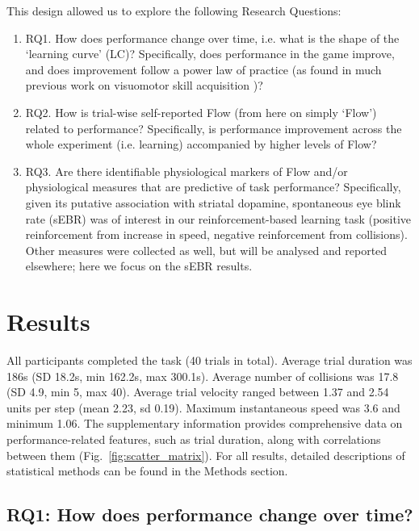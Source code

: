 \documentclass[fleqn,10pt]{wlscirep}
\begin{document}
This design allowed us to explore the following Research Questions:
\begin{enumerate}
	\item RQ1. How does performance change over time, i.e. what is the shape of the `learning curve' (LC)? Specifically, does performance in the game improve, and does improvement follow a power law of practice (as found in much previous work on visuomotor skill acquisition \cite{Newell1982})?

	\item RQ2. How is trial-wise self-reported Flow (from here on simply `Flow') related to performance? Specifically, is performance improvement across the whole experiment (i.e. learning) accompanied by higher levels of Flow?

	\item RQ3. Are there identifiable physiological markers of Flow and/or physiological measures that are predictive of task performance? Specifically, given its putative association with striatal dopamine\cite{Slagter2012}, spontaneous eye blink rate (sEBR) was of interest in our reinforcement-based learning task (positive reinforcement from increase in speed, negative reinforcement from collisions). Other measures were collected as well, but will be analysed and reported elsewhere; here we focus on the sEBR results.

\end{enumerate}

\section*{Results}
All participants completed the task (40 trials in total). Average trial duration was 186s (SD 18.2s, min 162.2s, max 300.1s). Average number of collisions was 17.8 (SD 4.9, min 5, max 40). Average trial velocity ranged between 1.37 and 2.54 units per step (mean 2.23, sd 0.19). Maximum instantaneous speed was 3.6 and minimum 1.06. The supplementary information provides comprehensive data on performance-related features, such as trial duration, along with correlations between them (Fig.~\ref{fig:scatter_matrix}). For all results, detailed descriptions of statistical methods can be found in the Methods section.

\subsection*{RQ1: How does performance change over time?}
\end{document}
